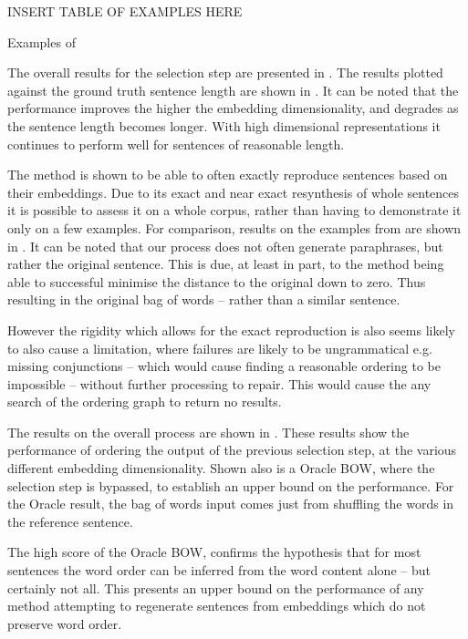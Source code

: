 \documentclass[11pt]{article}
\theoremstyle{plain}
\theoremstyle{definition}
\begin{document}
\begin{table*}[t!]
	\centering
	INSERT TABLE OF EXAMPLES HERE
	
	\caption{Examples of  }
	\label{table:examples}
\end{table*}


The overall results for the selection step are presented in . The results plotted against the ground truth sentence length are shown in . It can be noted that the performance improves the higher the embedding dimensionality, and degrades as the sentence length becomes longer. With high dimensional representations it continues to perform well for sentences of reasonable length.


The method is shown to be able to often exactly reproduce sentences based on their embeddings.  Due to its exact and near exact resynthesis of whole sentences it is possible to assess it on a whole corpus, rather than having to demonstrate it only on a few examples. For comparison, results on the examples from \textcite{Bowman2015SmoothGeneration,iyyer2014generating} are shown in .
It can be noted that  our process does not often generate paraphrases, but rather the original sentence. This is due, at least in part, to the method being able to successful minimise the distance to the original down to zero. Thus resulting in the original bag of words -- rather than a similar sentence.


However the rigidity which allows for the exact reproduction is also seems likely to also cause a limitation, where failures are likely to be ungrammatical e.g. missing conjunctions -- which would cause finding a reasonable ordering to be impossible -- without further processing to repair. This would cause the any search of the ordering graph to return no results.


The results on the overall process are shown in . These results show the performance of ordering the output of the previous selection step, at the various different embedding dimensionality. Shown also is a Oracle BOW, where the selection step is bypassed, to establish an upper bound on the performance. For the Oracle result, the bag of words input comes just from shuffling the words in the reference sentence.

The high score of the Oracle BOW, confirms the hypothesis that for most sentences the word order can be inferred from the word content alone -- but certainly not all. This presents an upper bound on the performance of any method attempting to regenerate sentences from embeddings which do not preserve word order. 
\end{document}
